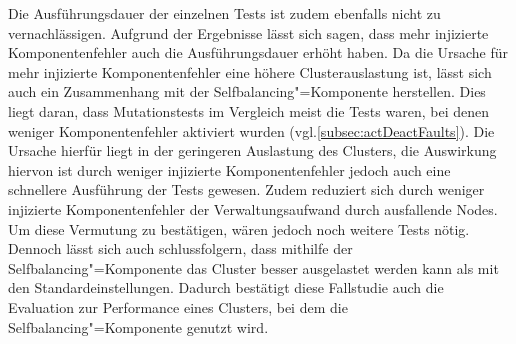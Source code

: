 Die Ausführungsdauer der einzelnen Tests ist zudem ebenfalls nicht zu vernachlässigen.
Aufgrund der Ergebnisse lässt sich sagen, dass mehr injizierte Komponentenfehler auch die Ausführungsdauer erhöht haben.
Da die Ursache für mehr injizierte Komponentenfehler eine höhere Clusterauslastung ist, lässt sich auch ein Zusammenhang mit der Selfbalancing"=Komponente \cite{Zhang2016} herstellen.
Dies liegt daran, dass Mutationstests im Vergleich meist die Tests waren, bei denen weniger Komponentenfehler aktiviert wurden (vgl.\cref{subsec:actDeactFaults}).
Die Ursache hierfür liegt in der geringeren Auslastung des Clusters, die Auswirkung hiervon ist durch weniger injizierte Komponentenfehler jedoch auch eine schnellere Ausführung der Tests gewesen.
Zudem reduziert sich durch weniger injizierte Komponentenfehler der Verwaltungsaufwand durch ausfallende Nodes.
Um diese Vermutung zu bestätigen, wären jedoch noch weitere Tests nötig.
Dennoch lässt sich auch schlussfolgern, dass mithilfe der Selfbalancing"=Komponente das Cluster besser ausgelastet werden kann als mit den Standardeinstellungen.
Dadurch bestätigt diese Fallstudie auch die Evaluation \cite{Zhang2016} zur Performance eines Clusters, bei dem die Selfbalancing"=Komponente genutzt wird.
